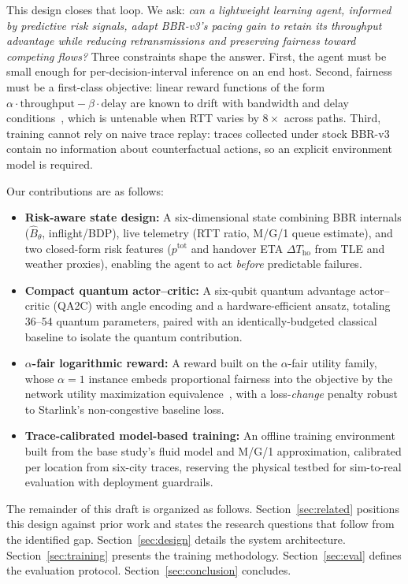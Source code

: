 \documentclass[journal]{IEEEtran}
\begin{document}
This design closes that loop. We ask: \emph{can a lightweight learning agent,
informed by predictive risk signals, adapt BBR-v3's pacing gain to retain its
throughput advantage while reducing retransmissions and preserving fairness
toward competing flows?} Three constraints shape the answer. First, the agent
must be small enough for per-decision-interval inference on an end host.
Second, fairness must be a first-class objective: linear reward functions of
the form $\alpha\cdot\mathrm{throughput}-\beta\cdot\mathrm{delay}$ are known
to drift with bandwidth and delay conditions~\cite{yu2026dnccq}, which is
untenable when RTT varies by $8\times$ across paths. Third, training cannot
rely on naive trace replay: traces collected under stock BBR-v3 contain no
information about counterfactual actions, so an explicit environment model is
required.

Our contributions are as follows:
\begin{itemize}
  \item \textbf{Risk-aware state design:} A six-dimensional state combining
  BBR internals ($\hat{B}_\theta$, inflight/BDP), live telemetry (RTT ratio,
  M/G/1 queue estimate), and two closed-form risk features
  ($p^{\mathrm{tot}}$ and handover ETA $\Delta T_{\mathrm{ho}}$ from TLE and
  weather proxies), enabling the agent to act \emph{before} predictable
  failures.
  \item \textbf{Compact quantum actor--critic:} A six-qubit quantum advantage
  actor--critic (QA2C) with angle encoding and a hardware-efficient
  ansatz, totaling 36--54 quantum parameters, paired with an
  identically-budgeted classical baseline to isolate the quantum
  contribution.
  \item \textbf{$\alpha$-fair logarithmic reward:} A reward built on the
  $\alpha$-fair utility family, whose $\alpha{=}1$ instance embeds
  proportional fairness into the objective by the network utility
  maximization equivalence~\cite{kelly1998, mo2000}, with a loss-\emph{change}
  penalty robust to Starlink's non-congestive baseline loss.
  \item \textbf{Trace-calibrated model-based training:} An offline training
  environment built from the base study's fluid model and M/G/1
  approximation, calibrated per location from six-city traces, reserving the
  physical testbed for sim-to-real evaluation with deployment guardrails.
\end{itemize}

The remainder of this draft is organized as follows.
Section~\ref{sec:related} positions this design against prior work and
states the research questions that follow from the identified gap.
Section~\ref{sec:design}
details the system architecture. Section~\ref{sec:training} presents the
training methodology. Section~\ref{sec:eval} defines the evaluation
protocol. Section~\ref{sec:conclusion} concludes.
\end{document}
